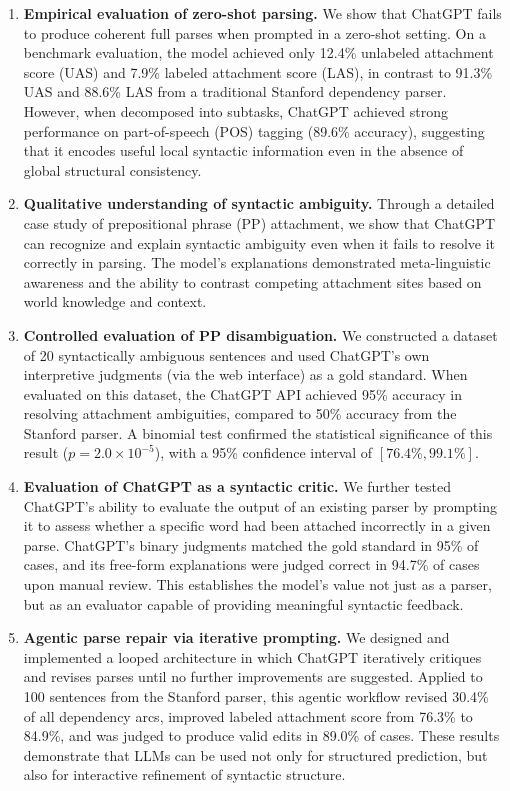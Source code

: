 \begin{enumerate}
    \item \textbf{Empirical evaluation of zero-shot parsing.} We show that ChatGPT fails to produce coherent full parses when prompted in a zero-shot setting. On a benchmark evaluation, the model achieved only 12.4\% unlabeled attachment score (UAS) and 7.9\% labeled attachment score (LAS), in contrast to 91.3\% UAS and 88.6\% LAS from a traditional Stanford dependency parser. However, when decomposed into subtasks, ChatGPT achieved strong performance on part-of-speech (POS) tagging (89.6\% accuracy), suggesting that it encodes useful local syntactic information even in the absence of global structural consistency.

    \item \textbf{Qualitative understanding of syntactic ambiguity.} Through a detailed case study of prepositional phrase (PP) attachment, we show that ChatGPT can recognize and explain syntactic ambiguity even when it fails to resolve it correctly in parsing. The model’s explanations demonstrated meta-linguistic awareness and the ability to contrast competing attachment sites based on world knowledge and context.

    \item \textbf{Controlled evaluation of PP disambiguation.} We constructed a dataset of 20 syntactically ambiguous sentences and used ChatGPT’s own interpretive judgments (via the web interface) as a gold standard. When evaluated on this dataset, the ChatGPT API achieved 95\% accuracy in resolving attachment ambiguities, compared to 50\% accuracy from the Stanford parser. A binomial test confirmed the statistical significance of this result ($p = 2.0 \times 10^{-5}$), with a 95\% confidence interval of $[76.4\%, 99.1\%]$.

    \item \textbf{Evaluation of ChatGPT as a syntactic critic.} We further tested ChatGPT’s ability to evaluate the output of an existing parser by prompting it to assess whether a specific word had been attached incorrectly in a given parse. ChatGPT’s binary judgments matched the gold standard in 95\% of cases, and its free-form explanations were judged correct in 94.7\% of cases upon manual review. This establishes the model’s value not just as a parser, but as an evaluator capable of providing meaningful syntactic feedback.

    \item \textbf{Agentic parse repair via iterative prompting.} We designed and implemented a looped architecture in which ChatGPT iteratively critiques and revises parses until no further improvements are suggested. Applied to 100 sentences from the Stanford parser, this agentic workflow revised 30.4\% of all dependency arcs, improved labeled attachment score from 76.3\% to 84.9\%, and was judged to produce valid edits in 89.0\% of cases. These results demonstrate that LLMs can be used not only for structured prediction, but also for interactive refinement of syntactic structure.


\end{enumerate}
